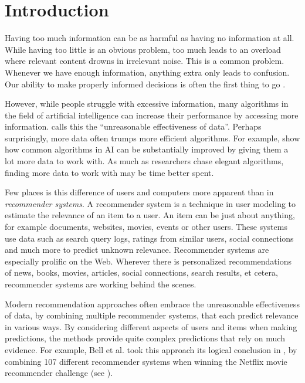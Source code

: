 \section{Introduction}
\label{sec:intro}

Having too much information can be as harmful as having no information at all.
While having too little is an obvious problem,
too much leads to an overload where relevant content drowns in irrelevant noise.
This is a common problem. Whenever we have enough information,
anything extra only leads to confusion.
Our ability to make properly informed decisions is often the first thing to go
\cite[p1]{Davenport2001}.

However, while people struggle with excessive information,
many algorithms in the field of artificial intelligence
can increase their performance by accessing more information.
\cite[p1]{Halevy2009} calls this the ``unreasonable effectiveness of data''.
Perhaps surprisingly, more data often trumps more efficient algorithms.
For example, \cite[p3]{Banko2001} show how common algorithms in AI 
can be substantially improved by giving them a lot more data to work with.
As much as researchers chase elegant algorithms, finding more data to work with may be time better spent.

Few places is this difference of users and computers more apparent than in \emph{recommender systems}.
A recommender system is a technique in user modeling to estimate the relevance of an item to a user.
An item can be just about anything, for example documents, websites, movies, events or other users.
These systems use data such as search query logs, 
ratings from similar users, social connections and much more
to predict unknown relevance.
Recommender systems are especially prolific on the Web. 
Wherever there is personalized recommendations of news, books, movies,
articles, social connections, search results, et cetera, recommender systems are working behind the scenes.

Modern recommendation approaches often embrace the 
unreasonable effectiveness of data,
by combining multiple recommender systems, that each predict relevance in various ways.
By considering different aspects of users and items when making predictions,
the methods provide quite complex predictions that rely on much evidence.
For example, Bell et al. took this approach its logical conclusion in \cite{Bell2007}, by 
combining 107 different recommender systems when winning the 
Netflix movie recommender challenge
(see \cite{Linden2009}).

